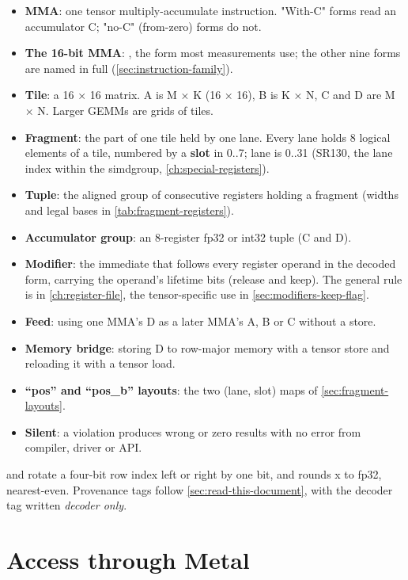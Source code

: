 \begin{itemize}
\item \textbf{MMA}: one tensor multiply-accumulate instruction. "With-C" forms read an accumulator C; "no-C" (from-zero) forms
  do not.
\item \textbf{The 16-bit MMA}: , the form most measurements use; the other
  nine forms are named in full (\cref{sec:instruction-family}).
\item \textbf{Tile}: a 16 × 16 matrix. A is M × K (16 × 16), B is K × N, C and D are M × N. Larger GEMMs are grids of tiles.
\item \textbf{Fragment}: the part of one tile held by one lane. Every lane holds 8 logical elements of a tile, numbered by a
  \textbf{slot}  in 0..7; lane  is 0..31 (SR130, the lane index within the simdgroup, \cref{ch:special-registers}).
\item \textbf{Tuple}: the aligned group of consecutive registers holding a fragment (widths and legal bases in
  \cref{tab:fragment-registers}).
\item \textbf{Accumulator group}: an 8-register fp32 or int32 tuple (C and D).
\item \textbf{Modifier}: the immediate that follows every register operand in the decoded form, carrying the operand's
  lifetime bits (release and keep). The general rule is in \cref{ch:register-file}, the tensor-specific use in \cref{sec:modifiers-keep-flag}.
\item \textbf{Feed}: using one MMA's D as a later MMA's A, B or C without a store.
\item \textbf{Memory bridge}: storing D to row-major memory with a tensor store and reloading it with a tensor load.
\item \textbf{\enquote{pos} and \enquote{pos\_b} layouts}: the two (lane, slot) maps of \cref{sec:fragment-layouts}.
\item \textbf{Silent}: a violation produces wrong or zero results with no error from compiler, driver or API.
\end{itemize}

 and  rotate a four-bit row index left or right by one bit, and  rounds x
to fp32, nearest-even. Provenance tags follow \cref{sec:read-this-document}, with the decoder tag written
\emph{decoder only}.

\section{Access through Metal}\label{sec:it-reached}

